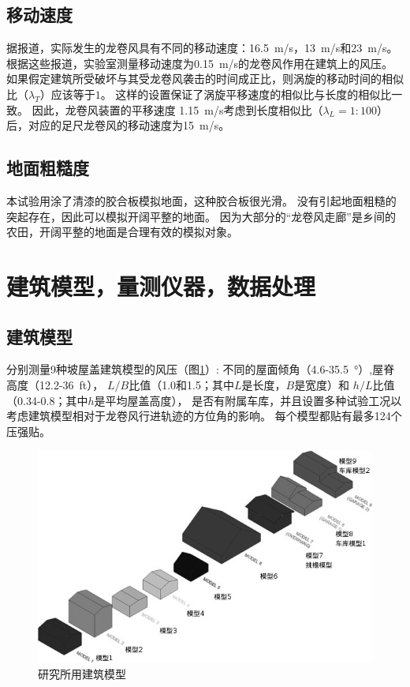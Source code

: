 \documentclass{ctexart}
\begin{document}
\subsection{移动速度}
据报道，实际发生的龙卷风具有不同的移动速度：\SI{16.5}{m/s}\cite{thampi2011finite}，\SI{13}{m/s}\cite{lee2005diagnosed}和\SI{23}{m/s}\cite{haan2008design}。
根据这些报道，实验室测量移动速度为\SI{0.15}{m/s}的龙卷风作用在建筑上的风压。
如果假定建筑所受破坏与其受龙卷风袭击的时间成正比，则涡旋的移动时间的相似比（$\lambda_T$）应该等于$1$。
这样的设置保证了涡旋平移速度的相似比与长度的相似比一致。
因此，龙卷风装置的平移速度 \SI{1.15}{m/s}考虑到长度相似比（$\lambda_L=1:100$）后，对应的足尺龙卷风的移动速度为\SI{15}{m/s}。

\subsection{地面粗糙度}
本试验用涂了清漆的胶合板模拟地面，这种胶合板很光滑。
没有引起地面粗糙的突起存在，因此可以模拟开阔平整的地面。
因为大部分的“龙卷风走廊”是乡间的农田，开阔平整的地面是合理有效的模拟对象。

\section{建筑模型，量测仪器，数据处理}
\subsection{建筑模型}
分别测量9种坡屋盖建筑模型的风压（图\ref{fig:building-models}）:
不同的屋面倾角（\num{4.6}-\SI{35.5}{\degree}）,屋脊高度（\num{12.2}-\SI{36}{ft}），
$L/B$比值（\num{1.0}和\num{1.5}；其中$L$是长度，$B$是宽度）和
$h/L$比值（\num{0.34}-\num{0.8}；其中$h$是平均屋盖高度），
是否有附属车库，并且设置多种试验工况以考虑建筑模型相对于龙卷风行进轨迹的方位角的影响。
每个模型都贴有最多\num{124}个压强贴。

\begin{figure}
\centering
\includegraphics{./fig/2}
\caption{研究所用建筑模型}
\label{fig:building-models}
\end{figure}
\end{document}
